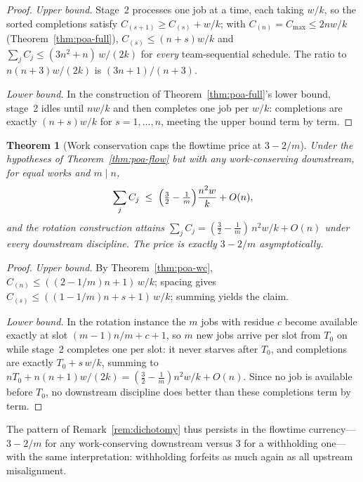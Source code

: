 \documentclass[sn-mathphys,NameDate]{sn-jnl}
\theoremstyle{thmstyleone}
\newtheorem{theorem}{Theorem}
\theoremstyle{thmstylethree}
\theoremstyle{thmstyletwo}
\begin{document}
\begin{proof}
\emph{Upper bound.} Stage~2 processes one job at a time, each
taking $w/k$, so the sorted completions satisfy
$C_{(s+1)} \ge C_{(s)} + w/k$; with
$C_{(n)} = C_{\max} \le 2nw/k$ (Theorem~\ref{thm:poa-full}),
$C_{(s)} \le (n+s)w/k$ and
$\sum_j C_j \le (3n^2+n)\,w/(2k)$ for \emph{every} team-sequential
schedule. The ratio to $n(n+3)w/(2k)$ is $(3n+1)/(n+3)$.

\emph{Lower bound.} In the construction of
Theorem~\ref{thm:poa-full}'s lower bound, stage~2 idles until
$nw/k$ and then completes one job per $w/k$: completions are
exactly $(n+s)w/k$ for $s = 1,\dots,n$, meeting the upper bound
term by term.
\end{proof}

\begin{theorem}[Work conservation caps the flowtime price at
$3 - 2/m$]\label{thm:poa-flow-wc}
Under the hypotheses of Theorem~\ref{thm:poa-flow} but with any
work-conserving downstream, for equal works and $m \mid n$,
\[
\sum_j C_j \;\le\;
\Bigl(\tfrac{3}{2} - \tfrac{1}{m}\Bigr)\frac{n^2 w}{k} + O(n),
\]
and the rotation construction attains
$\sum_j C_j = (\tfrac{3}{2} - \tfrac{1}{m})\,n^2 w/k + O(n)$ under
every downstream discipline. The price is exactly $3 - 2/m$
asymptotically.
\end{theorem}

\begin{proof}
\emph{Upper bound.} By Theorem~\ref{thm:poa-wc},
$C_{(n)} \le ((2-1/m)n + 1)\,w/k$; spacing gives
$C_{(s)} \le ((1-1/m)n + s + 1)\,w/k$; summing yields the claim.

\emph{Lower bound.} In the rotation instance the $m$ jobs with
residue $c$ become available exactly at slot $(m-1)n/m + c + 1$, so
$m$ new jobs arrive per slot from $T_0$ on while stage~2 completes
one per slot: it never starves after $T_0$, and completions are
exactly $T_0 + s\,w/k$, summing to
$n T_0 + n(n+1)w/(2k) = (\tfrac32 - \tfrac1m) n^2 w/k + O(n)$.
Since no job is available before $T_0$, no downstream discipline
does better than these completions term by term.
\end{proof}

The pattern of Remark~\ref{rem:dichotomy} thus persists in the
flowtime currency---$3 - 2/m$ for any work-conserving downstream
versus $3$ for a withholding one---with the same interpretation:
withholding forfeits as much again as all upstream misalignment.

\end{document}
